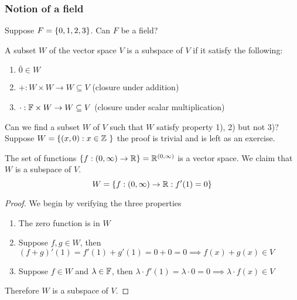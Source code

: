 \subsubsection*{Notion of a field}
Suppose $F  = \left\{ 0,1,2,3 \right\}$. Can $F$ be a field?
\begin{definition}
    A subset $W$ of the vector space $V$ is a subspace of $V$ if it satisfy the following:
    \begin{enumerate} [label  = \arabic*)]
        \item $\bar 0 \in W$ 
        \item $+ : W \times W \to W \subseteq V$ (closure under addition)
        \item $\cdot : \mathbb F \times W \to W \subseteq V$ (closure under scalar multiplication)
    \end{enumerate}
\end{definition}
\begin{example}
    Can we find a subset $W$ of $V$ such that $W$ satisfy property 1), 2) but not 3)? \\
    Suppose $W  =\lb (x,0) : x \in \b Z\ \rb$ the proof is trivial and is left as an exercise.
\end{example}
\begin{example}
    The set of functions $\left\{ f : (0 ,\infty) \to \mathbb R \right\} = \mathbb R^{(0,\infty)}$ is a vector space. We claim that $W$ is a subspace of $V$.
    \[ W = \left\{ f : (0,\infty) \to \mathbb R : f'(1) = 0 \right\}\]
\end{example}
\begin{proof}
    We begin by verifying the three properties
    \begin{enumerate} [label  = \arabic*)]
        \item The zero function is in $W$
        \item Suppose $f,g \in W$, then $(f + g)'(1) = f'(1) + g'(1) = 0 + 0 = 0 \implies f(x) + g(x) \in V$
        \item Suppose $f \in W$ and $\lambda \in \mathbb F$, then $\lambda \cdot f'(1) = \lambda \cdot 0 = 0 \implies \lambda \cdot f(x) \in V$
    \end{enumerate}
    Therefore $W$ is a subspace of $V$. 
\end{proof}
